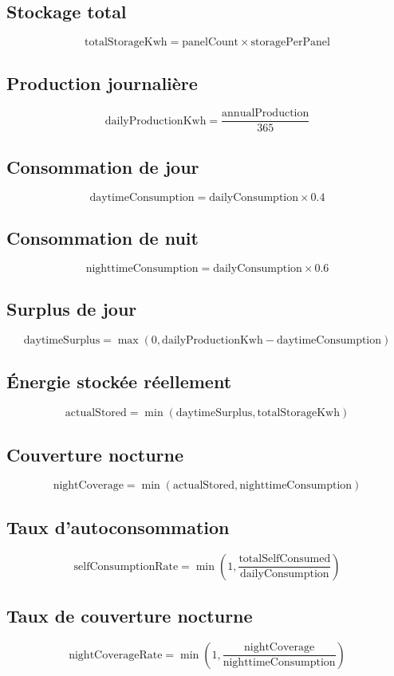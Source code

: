 \documentclass[12pt,a4paper]{article}
\begin{document}
\subsection{Stockage total}
\[
\text{totalStorageKwh} = \text{panelCount} \times \text{storagePerPanel}
\]

\subsection{Production journalière}
\[
\text{dailyProductionKwh} = \frac{\text{annualProduction}}{365}
\]

\subsection{Consommation de jour}
\[
\text{daytimeConsumption} = \text{dailyConsumption} \times 0.4
\]

\subsection{Consommation de nuit}
\[
\text{nighttimeConsumption} = \text{dailyConsumption} \times 0.6
\]

\subsection{Surplus de jour}
\[
\text{daytimeSurplus} = \max(0, \text{dailyProductionKwh} - \text{daytimeConsumption})
\]

\subsection{Énergie stockée réellement}
\[
\text{actualStored} = \min(\text{daytimeSurplus}, \text{totalStorageKwh})
\]

\subsection{Couverture nocturne}
\[
\text{nightCoverage} = \min(\text{actualStored}, \text{nighttimeConsumption})
\]

\subsection{Taux d'autoconsommation}
\[
\text{selfConsumptionRate} = \min\left(1, \frac{\text{totalSelfConsumed}}{\text{dailyConsumption}}\right)
\]

\subsection{Taux de couverture nocturne}
\[
\text{nightCoverageRate} = \min\left(1, \frac{\text{nightCoverage}}{\text{nighttimeConsumption}}\right)
\]
\end{document}
